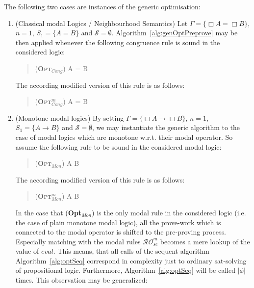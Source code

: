\documentclass{entcs} \usepackage{entcsmacro}
\begin{document}
\begin{example}
The following two cases are instances of the generic optimisation:
\begin{enumerate}
\item (Classical modal Logics / Neighbourhood Semantics) Let $\Gamma = \{\Box A = \Box B\}$,
$n=1$, $S_1=\{A=B\}$ and $\mathcal{S}=\emptyset$. Algorithm~\ref{alg:genOptPreprove}
may be then applied whenever the following congruence rule is sound in the considered
logic:
\begin{quote}
\begin{center}
      (\textsc {\textbf{Opt}$_{Cong}$}) 
                      { \Box A = \Box B }
  \end{center}
\end{quote}
The according modified version of this rule is as follows:
\begin{quote}
\begin{center}
      (\textsc {\textbf{Opt}$^m_{Cong}$}) 
                      { \Box A = \Box B }
  \end{center}
\end{quote}
\item (Monotone modal logics) By setting $\Gamma = \{\Box A \rightarrow \Box B\}$,
$n=1$, $S_1=\{A\rightarrow B\}$ and $\mathcal{S}=\emptyset$, we may instantiate
the generic algorithm to the case of modal logics which are monotone w.r.t. their
modal operator. So assume the following rule to be sound in  the considered modal
logic:
\begin{quote}
\begin{center}
      (\textsc {\textbf{Opt}$_{Mon}$}) 
                      { \Box A \rightarrow \Box B }
  \end{center}
\end{quote}
The according modified version of this rule is as follows:
\begin{quote}
\begin{center}
      (\textsc {\textbf{Opt}$^m_{Mon}$}) 
                      { \Box A \rightarrow \Box B }
  \end{center}
\end{quote}

In the case that (\textbf{Opt}$_{Mon}$) is the only modal rule in the
considered logic (i.e. the case of plain monotone modal logic), all the
prove-work which is connected to the modal operator is shifted to the
pre-proving process. Especially matching with the modal rules
$\mathcal{RO}^m_{sc}$ becomes a mere lookup of the value of $eval$.
This means, that all calls of the sequent algorithm Algorithm~\ref{alg:optSeq}
correspond in complexity just to ordinary sat-solving of propositional logic.
Furthermore, Algorithm~\ref{alg:optSeq} will be called $|\phi|$ times. This
observation may be generalized:
\end{enumerate}
\label{ex:neighMon}
\end{example}
\end{document}
